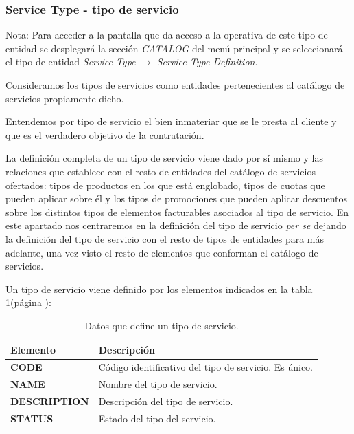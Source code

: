 \subsubsection{Service Type - tipo de servicio}
\label{sub:service-type}

Nota: Para acceder a la pantalla que da acceso a la operativa de este tipo de entidad se desplegará la sección \emph{CATALOG} del menú principal y se seleccionará el tipo de entidad \emph{Service Type} $\rightarrow$  \emph{Service Type Definition}.

Consideramos los tipos de servicios como entidades pertenecientes al catálogo de servicios propiamente dicho.

Entendemos por tipo de servicio el bien inmateriar que se le presta al cliente y que es el verdadero objetivo de la contratación.

La definición completa de un tipo de servicio viene dado por sí mismo y las relaciones que establece con el resto de entidades del catálogo de servicios ofertados: tipos de productos en los que está englobado, tipos de cuotas que pueden aplicar sobre él y los tipos de promociones que pueden aplicar descuentos sobre los distintos tipos de elementos facturables asociados al tipo de servicio. En este apartado nos centraremos en la definición del tipo de servicio \textit{per se} dejando la definición del tipo de servicio con el resto de tipos de entidades para más adelante, una vez visto el resto de elementos que conforman el catálogo de servicios.

Un tipo de servicio viene definido por los elementos indicados en la tabla \ref{tab:tipo-servicio}(página \pageref{tab:tipo-servicio}):



\begin{table}[H]
  \centering
  \setlength{\leftmargini}{0.4cm}
  \resizebox{14cm}{!} {
  \begin{tabular}{|m{3cm} m{11cm}|}
  \rowcolor{udcpink!25}
  \hline
  	\textbf{Elemento} & \textbf{Descripción} \\\hline
	\textbf{CODE} & Código identificativo del tipo de servicio. Es único.   \\
	\textbf{NAME} & Nombre del tipo de servicio. \\
	\textbf{DESCRIPTION} & Descripción del tipo de servicio. \\		
	\textbf{STATUS} & Estado del tipo del servicio.
	\\\hline
  \end{tabular}
  } %
  \caption{Datos que define un tipo de servicio.}
  \label{tab:tipo-servicio}
\end{table}

